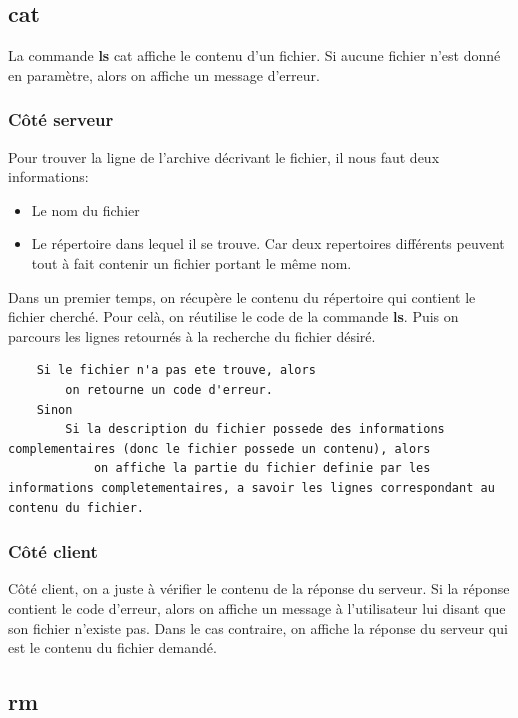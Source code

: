 \documentclass[titlepage]{article}
\begin{document}
	\subsection{cat}

	La commande \textbf{ls} cat affiche le contenu d'un fichier. Si aucune fichier n'est donné en paramètre, alors on affiche un message d'erreur.

	\subsubsection{Côté serveur}

	Pour trouver la ligne de l'archive décrivant le fichier, il nous faut deux informations:
	\begin{itemize}  
		\item Le nom du fichier   
		\item Le répertoire dans lequel il se trouve. Car deux repertoires différents peuvent tout à fait contenir un fichier portant le même nom.   
	\end{itemize}

	Dans un premier temps, on récupère le contenu du répertoire qui contient le fichier cherché. Pour celà, on réutilise le code de la commande \textbf{ls}. Puis on parcours les lignes retournés à la recherche du fichier désiré.

	\begin{lstlisting}
	Si le fichier n'a pas ete trouve, alors
		on retourne un code d'erreur.
	Sinon
		Si la description du fichier possede des informations complementaires (donc le fichier possede un contenu), alors
			on affiche la partie du fichier definie par les informations completementaires, a savoir les lignes correspondant au contenu du fichier.
	\end{lstlisting}

	\subsubsection{Côté client}

	Côté client, on a juste à vérifier le contenu de la réponse du serveur. Si la réponse contient le code d'erreur, alors on affiche un message à l'utilisateur lui disant que son fichier n'existe pas. Dans le cas contraire, on affiche la réponse du serveur qui est le contenu du fichier demandé.

	\subsection{rm}
\end{document}
